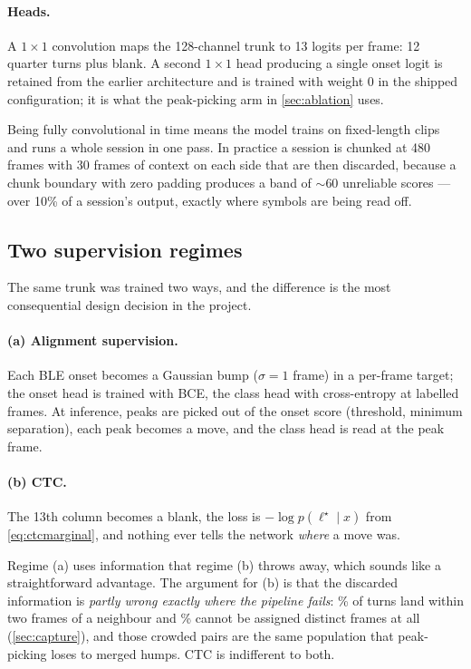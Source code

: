 \paragraph{Heads.} A $1\times1$ convolution maps the 128-channel trunk to 13
logits per frame: 12 quarter turns plus blank. A second $1\times1$ head
producing a single onset logit is retained from the earlier architecture and
is trained with weight $0$ in the shipped configuration; it is what the
peak-picking arm in \cref{sec:ablation} uses.

Being fully convolutional in time means the model trains on fixed-length
clips and runs a whole session in one pass. In practice a session is chunked
at 480 frames with 30 frames of context on each side that are then
discarded, because a chunk boundary with zero padding produces a band of
${\sim}60$ unreliable scores --- over 10\% of a session's output, exactly
where symbols are being read off.

\subsection{Two supervision regimes}
\label{sec:supervision}

The same trunk was trained two ways, and the difference is the most
consequential design decision in the project.

\paragraph{(a) Alignment supervision.} Each BLE onset becomes a Gaussian
bump ($\sigma = 1$ frame) in a per-frame target; the onset head is trained
with BCE, the class head with cross-entropy at labelled frames. At inference,
peaks are picked out of the onset score (threshold, minimum separation), each
peak becomes a move, and the class head is read at the peak frame.

\paragraph{(b) CTC.} The 13th column becomes a blank, the loss is
$-\log p(\ell^\star \mid x)$ from \cref{eq:ctcmarginal}, and nothing ever
tells the network \emph{where} a move was.

Regime (a) uses information that regime (b) throws away, which sounds like a
straightforward advantage. The argument for (b) is that the discarded
information is \emph{partly wrong exactly where the pipeline fails}:
\CorpusCrowdedTwo\% of turns land within two frames of a neighbour and
\CorpusSameFrame\% cannot be assigned distinct frames at all
(\cref{sec:capture}), and those crowded pairs are the same population that
peak-picking loses to merged humps. CTC is indifferent to both.

